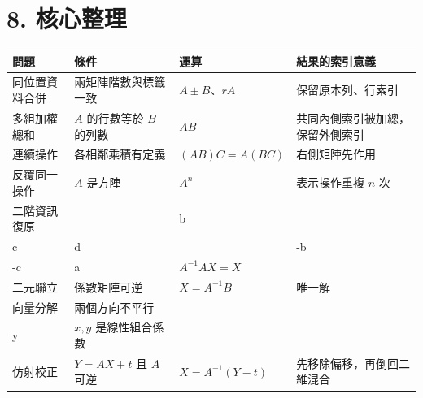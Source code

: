 \documentclass[11pt,a4paper]{article}
\newcounter{none}
\begin{document}
\section{8. 核心整理}\label{ux6838ux5fc3ux6574ux7406}

{\def\LTcaptype{none} %
\begin{longtable}[]{@{}
  >{\raggedright\arraybackslash}p{}
  >{\raggedright\arraybackslash}p{}
  >{\raggedright\arraybackslash}p{}
  >{\raggedright\arraybackslash}p{}@{}}
\toprule\noalign{}
\begin{minipage}[b]{\linewidth}\raggedright
問題
\end{minipage} & \begin{minipage}[b]{\linewidth}\raggedright
條件
\end{minipage} & \begin{minipage}[b]{\linewidth}\raggedright
運算
\end{minipage} & \begin{minipage}[b]{\linewidth}\raggedright
結果的索引意義
\end{minipage} \\
\midrule\noalign{}
\endhead
\bottomrule\noalign{}
\endlastfoot
同位置資料合併 & 兩矩陣階數與標籤一致 & \(A\pm B\)、\(rA\) & 保留原本列、行索引 \\
多組加權總和 & \(A\) 的行數等於 \(B\) 的列數 & \(AB\) & 共同內側索引被加總，保留外側索引 \\
連續操作 & 各相鄰乘積有定義 & \((AB)C=A(BC)\) & 右側矩陣先作用 \\
反覆同一操作 & \(A\) 是方陣 & \(A^n\) & 表示操作重複 \(n\) 次 \\
二階資訊復原 & \(A=\begin{bmatrix}a&b\\c&d\end{bmatrix}\) 且 \(ad-bc\ne0\) & \(A^{-1}=\dfrac1{ad-bc}\begin{bmatrix}d&-b\\-c&a\end{bmatrix}\) & \(A^{-1}AX=X\) \\
二元聯立 & 係數矩陣可逆 & \(X=A^{-1}B\) & 唯一解 \\
向量分解 & 兩個方向不平行 & \([\vec a\ \vec b]\begin{bmatrix}x\\y\end{bmatrix}=\vec c\) & \(x,y\) 是線性組合係數 \\
仿射校正 & \(Y=AX+t\) 且 \(A\) 可逆 & \(X=A^{-1}(Y-t)\) & 先移除偏移，再倒回二維混合 \\
\end{longtable}
}
\end{document}
